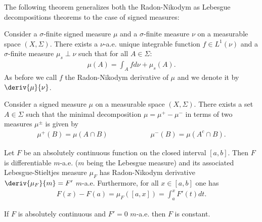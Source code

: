     The following theorem generalizes both the Radon-Nikodym as Lebesgue decompositions theorems to the case of signed measures:
    \begin{theorem}\label{lebesgue:signed_radon_nikodym}
        Consider a $\sigma$-finite signed measure $\mu$ and a $\sigma$-finite measure $\nu$ on a measurable space $(X, \Sigma)$. There exists a $\nu$-a.e. unique integrable function $f\in L^1(\nu)$ and a $\sigma$-finite measure $\mu_s\perp\nu$ such that for all $A\in\Sigma$:
        \begin{gather}
            \mu(A) = \int_Afd\nu + \mu_s(A).
        \end{gather}
        As before we call $f$ the Radon-Nikodym derivative of $\mu$ and we denote it by $\deriv{\mu}{\nu}$.
    \end{theorem}

    \begin{theorem}
        Consider a signed measure $\mu$ on a measurable space $(X, \Sigma)$. There exists a set $A\in\Sigma$ such that the minimal decomposition $\mu=\mu^+-\mu^-$ in terms of two measures $\mu^\pm$ is given by
        \begin{gather}
            \mu^+(B) = \mu(A\cap B)\qquad\qquad\qquad\mu^-(B)=\mu(A^c\cap B).
        \end{gather}
    \end{theorem}



    \begin{theorem}
        Let $F$ be an absolutely continuous function on the closed interval $[a,b]$. Then $F$ is differentiable $m$-a.e. ($m$ being the Lebesgue measure) and its associated  Lebesgue-Stieltjes measure $\mu_F$ has Radon-Nikodym derivative $\deriv{\mu_F}{m}=F'$ $m$-a.e. Furthermore, for all $x\in[a,b]$ one has
        \begin{gather}
            F(x) - F(a) = \mu_F([a,x]) = \int_a^xF'(t)dt.
        \end{gather}
    \end{theorem}
    \begin{result}
        If $F$ is absolutely continuous and $F'=0$ $m$-a.e. then $F$ is constant.
    \end{result}